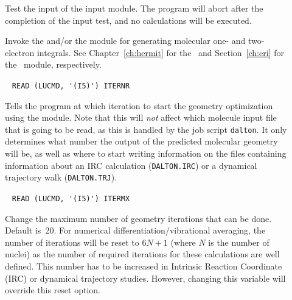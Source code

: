 \begin{description}

\item[] Test the input of the  input
module. The program will abort after the completion of the input test,
and no calculations will be executed.

\item[] Invoke the {\her} and/or the {\eri} module for generating molecular one-
and two-electron integrals.
See Chapter~\ref{ch:hermit} for the \her\ and
Section~\ref{ch:eri} for the \eri\ module, respectively.

\item[]\verb| |\newline
\verb|READ (LUCMD, '(I5)') ITERNR|

Tells the program at which iteration to start the geometry optimization
using the  module.
Note that this will {\em not} affect which molecule
input file that is going to be read, as this is handled by the
job script {\tt dalton}. It only determines what number the
output of the predicted molecular geometry will be, as well as where to start
writing information on the files containing information about an IRC
calculation (\verb|DALTON.IRC|) or a dynamical trajectory walk (\verb|DALTON.TRJ|).

\item[]\verb| |\newline
\verb|READ (LUCMD, '(I5)') ITERMX|

Change the maximum number of geometry iterations
that can be done. Default
is~20.  For numerical
differentiation/vibrational averaging, the number of iterations will
be reset to $6N+1$ (where $N$ is the number of nuclei) as the number
of required iterations for these calculations are well
defined. This number has to be increased in Intrinsic Reaction Coordinate
(IRC) or dynamical
trajectory studies. However, changing this variable will override this reset
option.



\end{description}

